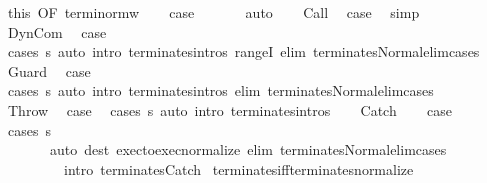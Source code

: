 \begin{isabellebody}
\ this\ {\isacharbrackleft}OF\ termi{\isacharunderscore}norm{\isacharunderscore}w{\isacharbrackright}\isanewline
\ \ \isamarkupfalse%
\ {\isacharquery}case\ \isanewline
\ \ \ \ \isamarkupfalse%
\ auto\isanewline
{}\isamarkupfalse%
\isanewline
\ \ \isamarkupfalse%
\ Call\ \isamarkupfalse%
\ {\isacharquery}case\ \isamarkupfalse%
\ simp\isanewline
{}\isamarkupfalse%
\isanewline
\ \ \isamarkupfalse%
\ DynCom\ \isamarkupfalse%
\ {\isacharquery}case\ \isanewline
\ \ \ \ \isamarkupfalse%
\ {\isacharparenleft}cases\ s{\isacharparenright}\ {\isacharparenleft}auto\ intro{\isacharcolon}\ terminates{\isachardot}intros\ rangeI\ elim{\isacharcolon}\ terminates{\isacharunderscore}Normal{\isacharunderscore}elim{\isacharunderscore}cases{\isacharparenright}\isanewline
{}\isamarkupfalse%
\isanewline
\ \ \isamarkupfalse%
\ Guard\ \isamarkupfalse%
\ {\isacharquery}case\ \isanewline
\ \ \ \ \isamarkupfalse%
\ {\isacharparenleft}cases\ s{\isacharparenright}\ {\isacharparenleft}auto\ intro{\isacharcolon}\ terminates{\isachardot}intros\ elim{\isacharcolon}\ terminates{\isacharunderscore}Normal{\isacharunderscore}elim{\isacharunderscore}cases{\isacharparenright}\isanewline
{}\isamarkupfalse%
\isanewline
\ \ \isamarkupfalse%
\ Throw\ \isamarkupfalse%
\ {\isacharquery}case\ \isamarkupfalse%
\ {\isacharparenleft}cases\ s{\isacharparenright}\ {\isacharparenleft}auto\ intro{\isacharcolon}\ terminates{\isachardot}intros{\isacharparenright}\isanewline
{}\isamarkupfalse%
\isanewline
\ \ \isamarkupfalse%
\ Catch\isanewline
\ \ \isamarkupfalse%
\ {\isacharquery}case\isanewline
\ \ \ \ \isamarkupfalse%
\ {\isacharparenleft}cases\ s{\isacharparenright}\ \isanewline
\ \ \ \ \ \ \ {\isacharparenleft}auto\ dest{\isacharcolon}\ exec{\isacharunderscore}to{\isacharunderscore}exec{\isacharunderscore}normalize\ elim{\isacharbang}{\isacharcolon}\ terminates{\isacharunderscore}Normal{\isacharunderscore}elim{\isacharunderscore}cases\ \isanewline
\ \ \ \ \ \ \ \ \ intro{\isacharbang}{\isacharcolon}\ terminates{\isachardot}Catch{\isacharparenright}\isanewline
{}\isamarkupfalse%
%
\endisatagproof
{\isafoldproof}%
%
\isadelimproof
\isanewline
%
\endisadelimproof
\isanewline
{}\isamarkupfalse%
\ terminates{\isacharunderscore}iff{\isacharunderscore}terminates{\isacharunderscore}normalize{\isacharcolon}\isanewline

\end{isabellebody}
